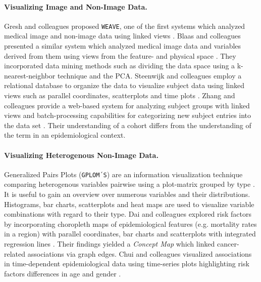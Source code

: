\documentclass[journal]{style/vgtc} 			          %
\begin{document}
\paragraph{Visualizing Image and Non-Image Data. }
Gresh and colleagues proposed \texttt{WEAVE}, one of the first systems which analyzed medical image and non-image data using linked views \cite{Gresh2000}.
%
Blaas and colleagues presented a similar system which analyzed medical image data and variables derived from them using views from the feature- and physical space \cite{Blaas2007}.
%
They incorporated data mining methods such as dividing the data space using a k-nearest-neighbor technique and the PCA.
%
Steenwijk and colleagues employ a relational database to organize the data to visualize subject data using linked views such as parallel coordinates, scatterplots and time plots \cite{Steenwijk2010}.
%
Zhang and colleagues provide a web-based system for analyzing subject groups with linked views and batch-processing capabilities for categorizing new subject entries into the data set \cite{Zhang2012}.
%
Their understanding of a cohort differs from the understanding of the term in an epidemiological context.

\paragraph{Visualizing Heterogenous Non-Image Data.}
Generalized Pairs Plots (\texttt{GPLOM´S}) are an information visualization technique comparing heterogenous variables pairwise using a plot-matrix grouped by type \cite{Francois2013}.
%
It is useful to gain an overview over numerous variables and their distributions.
%
Histograms, bar charts, scatterplots and heat maps are used to visualize variable combinations with regard to their type.
%
%
%
%
Dai and colleagues explored risk factors by incorporating choropleth maps of epidemiological features (e.g. mortality rates in a region) with parallel coordinates, bar charts and scatterplots with integrated regression lines \cite{Dai2005}.
%
Their findings yielded a \emph{Concept Map} which linked cancer-related associations via graph edges.
Chui and colleagues visualized associations in time-dependent epidemiological data using time-series plots highlighting risk factors differences in age and gender \cite{Chui2011}.
\end{document}
